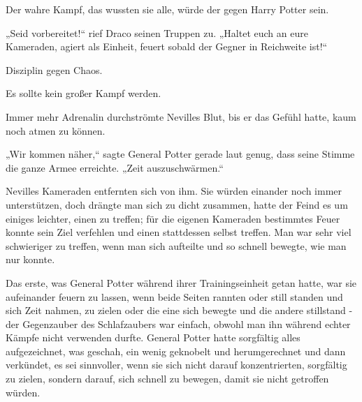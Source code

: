Der wahre Kampf, das wussten sie alle, würde der gegen Harry Potter sein.

„Seid vorbereitet!“ rief Draco seinen Truppen zu. „Haltet euch an eure Kameraden, agiert als Einheit, feuert sobald der Gegner in Reichweite ist!“

Disziplin gegen Chaos.

Es sollte kein großer Kampf werden.

\later

Immer mehr Adrenalin durchströmte Nevilles Blut, bis er das Gefühl hatte, kaum noch atmen zu können.

„Wir kommen näher,“ sagte General Potter gerade laut genug, dass seine Stimme die ganze Armee erreichte. „Zeit auszuschwärmen.“

Nevilles Kameraden entfernten sich von ihm. Sie würden einander noch immer unterstützen, doch drängte man sich zu dicht zusammen, hatte der Feind es um einiges leichter, einen zu treffen; für die eigenen Kameraden bestimmtes Feuer konnte sein Ziel verfehlen und einen stattdessen selbst treffen. Man war sehr viel schwieriger zu treffen, wenn man sich aufteilte und so schnell bewegte, wie man nur konnte.

Das erste, was General Potter während ihrer Trainingseinheit getan hatte, war sie aufeinander feuern zu lassen, wenn beide Seiten rannten oder still standen und sich Zeit nahmen, zu zielen oder die eine sich bewegte und die andere stillstand - der Gegenzauber des Schlafzaubers war einfach, obwohl man ihn während echter Kämpfe nicht verwenden durfte. General Potter hatte sorgfältig alles aufgezeichnet, was geschah, ein wenig geknobelt und herumgerechnet und dann verkündet, es sei sinnvoller, wenn sie sich nicht darauf konzentrierten, sorgfältig zu zielen, sondern darauf, sich schnell zu bewegen, damit sie nicht getroffen würden.

